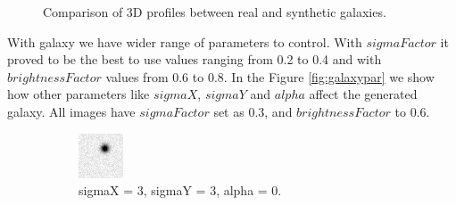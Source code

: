 \begin{figure}[!h]
    \caption{Comparison of 3D profiles between real and synthetic galaxies.}
    \label{fig:galaxy3D}
\end{figure}

With galaxy we have wider range of parameters to control. With $sigmaFactor$ it proved to be the best to use values ranging from 0.2 to 0.4 and with $brightnessFactor$ values from 0.6 to 0.8. In the Figure \ref{fig:galaxypar} we show how other parameters like $sigmaX$, $sigmaY$ and $alpha$ affect the generated galaxy. All images have $sigmaFactor$ set as 0.3, and $brightnessFactor$ to 0.6.  


\begin{figure}[!h]
\centering
    \begin{subfigure}[t]{.23\textwidth}
        \centering
        \includegraphics[width=\textwidth]{images/galaxyA.png}
        \caption{sigmaX = 3, sigmaY = 3, alpha = 0.}
        \label{fig:galaxyA}
    \end{subfigure}
    \begin{subfigure}[t]{.23\textwidth}
        \centering

\end{subfigure}
\end{figure}
